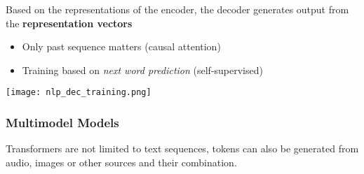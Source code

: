 Based on the representations of the encoder, the decoder generates output from the \textbf{representation vectors}
\newpar{}
\begin{itemize}
    \item Only past sequence matters (causal attention)
    \item Training based on \textit{next word prediction} (self-supervised)
\end{itemize}
\begin{center}
    \texttt{[image: nlp\_dec\_training.png]}
\end{center}

\subsubsection{Multimodel Models}
Transformers are not limited to text sequences, tokens can also be generated from audio, images or other sources and their combination.
